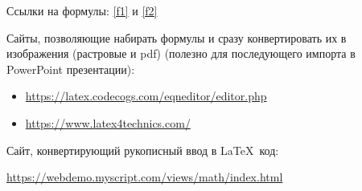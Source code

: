 Ссылки на формулы: \ref{f1} и \ref{f2}

Сайты, позволяющие набирать формулы и сразу конвертировать их в изображения (растровые и pdf) (полезно для последующего импорта в PowerPoint презентации):
\begin{itemize}
	\item \href{https://latex.codecogs.com/eqneditor/editor.php}{https://latex.codecogs.com/eqneditor/editor.php} 
	\item \href{https://www.latex4technics.com/}{https://www.latex4technics.com/}
\end{itemize}

Сайт, конвертирующий рукописный ввод в \LaTeX~код:

\href{https://webdemo.myscript.com/views/math/index.html}{https://webdemo.myscript.com/views/math/index.html}